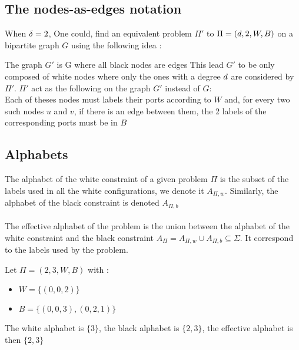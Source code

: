 \subsection{The nodes-as-edges notation}
When $\delta = 2$, One could, find an equivalent problem $\Pi'$ to $\Pi = (d,2,W,B)$ on a bipartite graph $G$ using the following idea \cite{1}:

The graph $G'$ is G where all black nodes are edges This lead $G'$ to be only composed of white nodes where only the ones with a degree $d$ are considered by $\Pi'$.
$\Pi'$ act as the following on the graph $G'$ instead of $G$:\\
Each of theses nodes must labels their ports according to $W$ and, for every two such nodes $u$ and $v$, if there is an edge between them, the 2 labels of the corresponding ports must be in $B$\\

\subsection{Alphabets}
The alphabet of the white constraint of a given problem $\Pi$ is the subset of the labels used in all the white configurations, we denote it $A_{\Pi,w}$. Similarly, the alphabet of the black constraint is denoted $A_{\Pi,b}$\\\\
The effective alphabet of the problem is the union between the alphabet of the white constraint and the black constraint $A_{\Pi} = A_{\Pi,w} \cup A_{\Pi,b} \subseteq \Sigma$. It correspond to the labels used by the problem.
\begin{exmp}
Let $\Pi = (2,3,W,B)$ with :
\begin{itemize}
    \item $W = \{(0,0,2)\}$
    \item $B = \{(0,0,3),(0,2,1)\}$
\end{itemize}
The white alphabet is $\{3\}$, the black alphabet is $\{2,3\}$, the effective alphabet is then $\{2,3\}$
\end{exmp}
